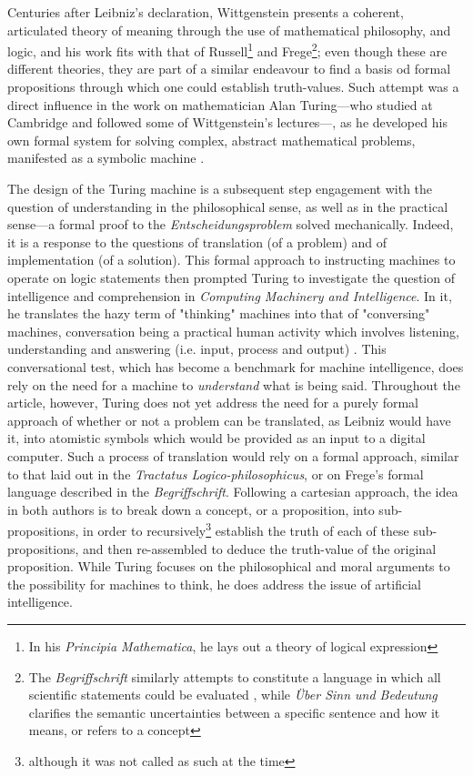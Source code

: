Centuries after Leibniz's declaration, Wittgenstein presents a coherent, articulated theory of meaning through the use of mathematical philosophy, and logic, and his work fits with that of Russell\footnote{In his \emph{Principia Mathematica}, he lays out a theory of logical expression} and Frege\footnote{The \emph{Begriffschrift} similarly attempts to constitute a language in which all scientific statements could be evaluated \citep{korte_frege_2010}, while \emph{Über Sinn und Bedeutung} clarifies the semantic uncertainties between a specific sentence and how it means, or refers to a concept}; even though these are different theories, they are part of a similar endeavour to find a basis od formal propositions through which one could establish truth-values. Such attempt was a direct influence in the work on mathematician Alan Turing—who studied at Cambridge and followed some of Wittgenstein's lectures—, as he developed his own formal system for solving complex, abstract mathematical problems, manifested as a symbolic machine \citep{turing_computable_1936}.

The design of the Turing machine is a subsequent step engagement with the question of understanding in the philosophical sense, as well as in the practical sense—a formal proof to the \emph{Entscheidungsproblem} solved mechanically. Indeed, it is a response to the questions of translation (of a problem) and of implementation (of a solution). This formal approach to instructing machines to operate on logic statements then prompted Turing to investigate the question of intelligence and comprehension in \emph{Computing Machinery and Intelligence}. In it, he translates the hazy term of "thinking" machines into that of "conversing" machines, conversation being a practical human activity which involves listening, understanding and answering (i.e. input, process and output) \citep{turing_computing_2009}. This conversational test, which has become a benchmark for machine intelligence, does rely on the need for a machine to \emph{understand} what is being said. Throughout the article, however, Turing does not yet address the need for a purely formal approach of whether or not a problem can be translated, as Leibniz would have it, into atomistic symbols which would be provided as an input to a digital computer. Such a process of translation would rely on a formal approach, similar to that laid out in the \emph{Tractatus Logico-philosophicus}, or on Frege's formal language described in the \emph{Begriffschrift}. Following a cartesian approach, the idea in both authors is to break down a concept, or a proposition, into sub-propositions, in order to recursively\footnote{although it was not called as such at the time} establish the truth of each of these sub-propositions, and then re-assembled to deduce the truth-value of the original proposition. While Turing focuses on the philosophical and moral arguments to the possibility for machines to think, he does address the issue of artificial intelligence.

